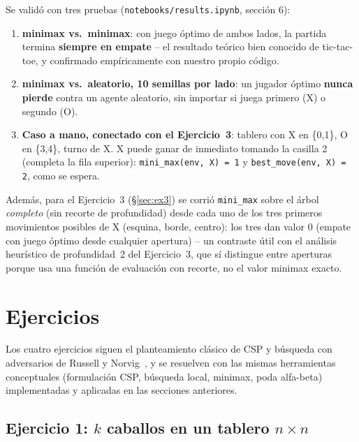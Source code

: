 \documentclass[11pt,onecolumn,letterpaper]{article}
\newcommand{\code}[1]{\texttt{#1}}
\begin{document}
Se valid\'o con tres pruebas (\code{notebooks/results.ipynb}, secci\'on 6):
\begin{enumerate}[label=\arabic*.]
\item \textbf{minimax vs.\ minimax}: con juego \'optimo de ambos lados, la partida termina
  \textbf{siempre en empate} -- el resultado te\'orico bien conocido de tic-tac-toe, y
  confirmado emp\'iricamente con nuestro propio c\'odigo.
\item \textbf{minimax vs.\ aleatorio, 10 semillas por lado}: un jugador \'optimo
  \textbf{nunca pierde} contra un agente aleatorio, sin importar si juega primero (X) o
  segundo (O).
\item \textbf{Caso a mano, conectado con el Ejercicio~3}: tablero con X en \{0,1\}, O en
  \{3,4\}, turno de X. X puede ganar de inmediato tomando la casilla 2 (completa la fila
  superior): \code{mini\_max(env, X) = 1} y \code{best\_move(env, X) = 2}, como se espera.
\end{enumerate}

Adem\'as, para el Ejercicio~3 (\S\ref{sec:ex3}) se corri\'o \code{mini\_max} sobre el \'arbol
\emph{completo} (sin recorte de profundidad) desde cada uno de los tres primeros
movimientos posibles de X (esquina, borde, centro): los tres dan valor $0$ (empate con
juego \'optimo desde cualquier apertura) -- un contraste \'util con el an\'alisis
heur\'istico de profundidad~2 del Ejercicio~3, que s\'i distingue entre aperturas porque usa
una funci\'on de evaluaci\'on con recorte, no el valor minimax exacto.

\section{Ejercicios}

Los cuatro ejercicios siguen el planteamiento cl\'asico de CSP y b\'usqueda con
adversarios de Russell y Norvig~\cite{russellnorvig2021}, y se resuelven con las mismas
herramientas conceptuales (formulaci\'on CSP, b\'usqueda local, minimax, poda alfa-beta)
implementadas y aplicadas en las secciones anteriores.

\subsection{Ejercicio 1: $k$ caballos en un tablero $n\times n$}
\label{sec:ex1}
\end{document}
